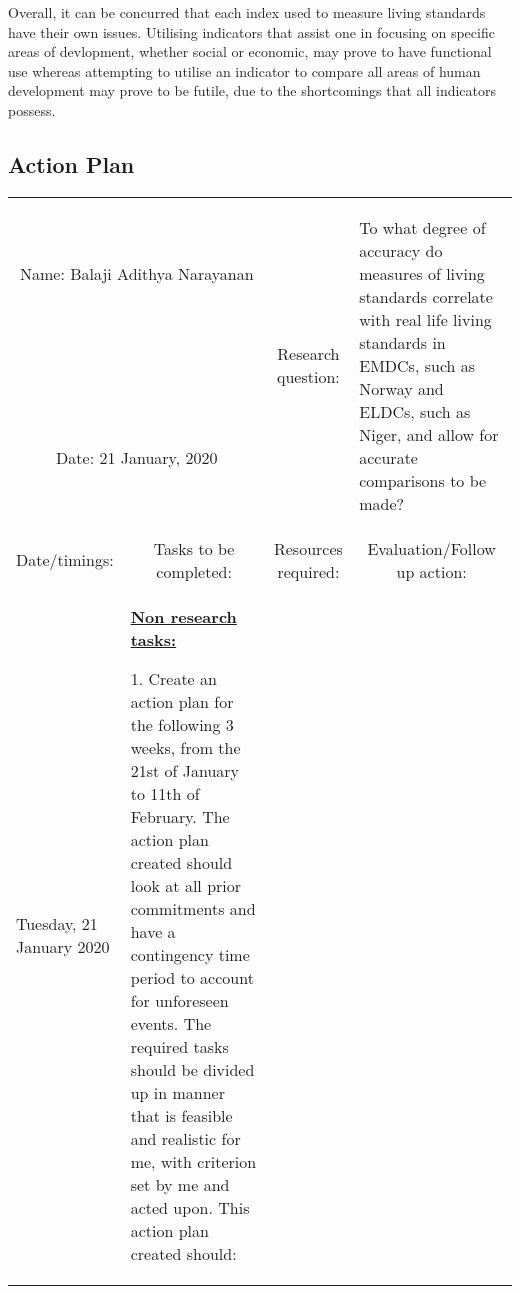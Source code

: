 \documentclass[11pt, a4paper]{article}
\begin{document}
		Overall, it can be concurred that each index used to measure living standards have their own issues. Utilising indicators that assist one in focusing on specific areas of devlopment, whether social or economic, may prove to have functional use whereas attempting to utilise an indicator to compare all areas of human development may prove to be futile, due to the shortcomings that all indicators possess.

	\singlespacing
	\newpage
	\begin{landscape}
		\appendix
		\appendixpage
		\appendixheaderon
		\section{Action Plan}
			\begin{longtable}{|m{2.5cm}|m{6.6cm}|m{6.6cm}|m{9.41cm}|}
				\hline
			
				\multicolumn{2}{|c|}{Name: Balaji Adithya Narayanan} & \multicolumn{1}{c|}{\multirow{3}{5cm}{\begin{flushright} Research question:\end{flushright}}} & \multirow{3}{9.41cm}{\begin{scriptsize}
					To what degree of accuracy do measures of living standards correlate with real life living standards in EMDCs, such as Norway and ELDCs, such as Niger, and allow for accurate comparisons to be made?
				\end{scriptsize}} \\
			
				\multicolumn{2}{|c|}{}& & \\
				\cline{1-2}
			
				\multicolumn{2}{|c|}{Date: 21 January, 2020} & &\\
				\hline
			
				Date/timings: & \multicolumn{1}{c}{Tasks to be completed:} &\multicolumn{1}{|c|}{Resources required:} & \multicolumn{1}{c|}{Evaluation/Follow up action:}\\
				\hline
			
				Tuesday, 21 January 2020 &
				\underline{\textbf{Non research tasks:}}
			
				1. Create an action plan for the following 3 weeks, from the 21st of January to 11th of February. The action plan created should look at all prior commitments and have a contingency time period to account for unforeseen events. The required tasks should be divided up in manner that is feasible and realistic for me, with criterion set by me and acted upon. This action plan created should:
		

\end{longtable}
\end{landscape}
\end{document}
